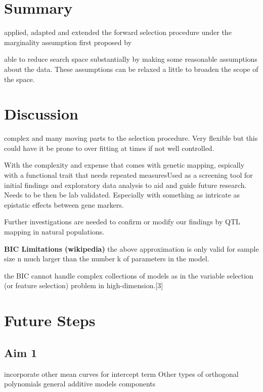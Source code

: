 \documentclass[11pt,]{book}
\theoremstyle{definition}
\theoremstyle{definition}
\theoremstyle{remark}
\begin{document}
\section{Summary}\label{summary}

applied, adapted and extended the forward selection procedure under the
marginality assumption first proposed by \cite{hao2014interaction}

able to reduce search space substantially by making some reasonable
assumptions about the data. These assumptions can be relaxed a little to
broaden the scope of the space.

\section{Discussion}\label{discussion-3}

complex and many moving parts to the selection procedure. Very flexible
but this could have it be prone to over fitting at times if not well
controlled.

With the complexity and expense that comes with genetic mapping,
espically with a functional trait that needs repeated measuresUsed as a
screening tool for initial findings and exploratory data analysis to aid
and guide future research. Needs to be then be lab validated. Especially
with something as intricate as epistatic effects between gene markers.

Further investigations are needed to confirm or modify our findings by
QTL mapping in natural populations.

\textbf{BIC Limitations (wikipedia)} the above approximation is only
valid for sample size n much larger than the number k of parameters in
the model.

the BIC cannot handle complex collections of models as in the variable
selection (or feature selection) problem in high-dimension.{[}3{]}

\section{Future Steps}\label{future-steps}

\subsection{Aim 1}\label{aim-1}

incorporate other mean curves for intercept term Other types of
orthogonal polynomials general additive models components
\end{document}
